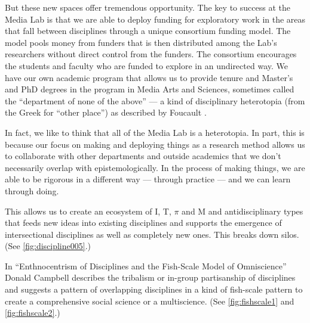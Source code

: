 But these new spaces offer tremendous opportunity. The key to success at the Media Lab is that we are able to deploy funding for exploratory work in the areas that fall between disciplines through a unique consortium funding model. The model pools money from funders that is then distributed among the Lab's researchers without direct control from the funders. The consortium encourages the students and faculty who are funded to explore in an undirected way. We have our own academic program that allows us to provide tenure and Master's and PhD degrees in the program in Media Arts and Sciences, sometimes called the ``department of none of the above'' --- a kind of disciplinary heterotopia (from the Greek for ``other place'') as described by Foucault \cite{foucault_order_2002}. 

In fact, we like to think that all of the Media Lab is a heterotopia. In part, this is because our focus on making and deploying things as a research method allows us to collaborate with other departments and outside academics that we don't necessarily overlap with epistemologically. In the process of making things, we are able to be rigorous in a different way --- through practice --- and we can learn through doing.

This allows us to create an ecosystem of I, T, \(\pi\) and M and antidisciplinary types that feeds new ideas into existing disciplines and supports the emergence of intersectional disciplines as well as completely new ones. This breaks down silos. (See \autoref{fig:discipline005}.)

In ``Enthnocentrism of Disciplines and the Fish-Scale Model of Omniscience'' \cite{campbell1969ethnocentrism} Donald Campbell describes the tribalism or in-group partisanship of disciplines and suggests a pattern of overlapping disciplines in a kind of fish-scale pattern to create a comprehensive social science or a multiscience. (See \autoref{fig:fishscale1} and \autoref{fig:fishscale2}.)

